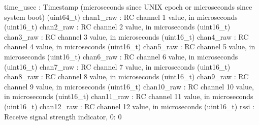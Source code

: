 \begin{DoxyVerb}
\begin{DoxyVerb}
\begin{DoxyVerb}
time_usec                 : Timestamp (microseconds since UNIX epoch or microseconds since system boot) (uint64_t)
chan1_raw                 : RC channel 1 value, in microseconds (uint16_t)
chan2_raw                 : RC channel 2 value, in microseconds (uint16_t)
chan3_raw                 : RC channel 3 value, in microseconds (uint16_t)
chan4_raw                 : RC channel 4 value, in microseconds (uint16_t)
chan5_raw                 : RC channel 5 value, in microseconds (uint16_t)
chan6_raw                 : RC channel 6 value, in microseconds (uint16_t)
chan7_raw                 : RC channel 7 value, in microseconds (uint16_t)
chan8_raw                 : RC channel 8 value, in microseconds (uint16_t)
chan9_raw                 : RC channel 9 value, in microseconds (uint16_t)
chan10_raw                : RC channel 10 value, in microseconds (uint16_t)
chan11_raw                : RC channel 11 value, in microseconds (uint16_t)
chan12_raw                : RC channel 12 value, in microseconds (uint16_t)
rssi                      : Receive signal strength indicator, 0: 0%
 \mbox{\label{classpymavlink_1_1dialects_1_1v10_1_1MAVLink_a4c417fef006f127caae7f93f769d1d62}} 

\end{DoxyVerb}
\end{DoxyVerb}
\end{DoxyVerb}
